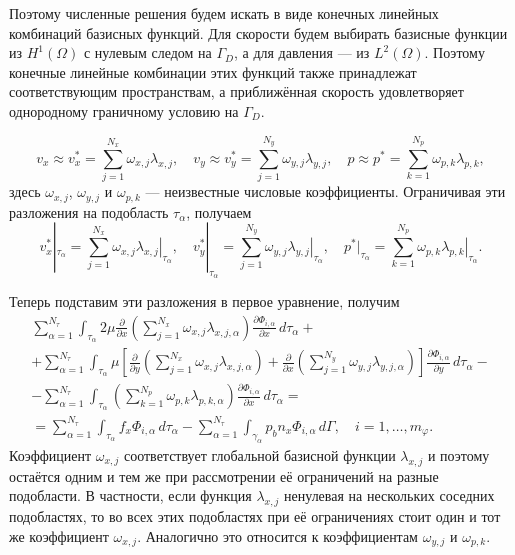 \documentclass[a4paper,14pt]{extarticle}
\begin{document}
Поэтому численные решения будем искать в виде конечных линейных комбинаций базисных функций.
Для скорости будем выбирать базисные функции из
$H^1(\Omega)$ с нулевым следом на $\Gamma_D$, а для давления
--- из $L^2(\Omega)$. Поэтому конечные линейные комбинации
этих функций также принадлежат соответствующим пространствам,
а приближённая скорость удовлетворяет однородному граничному
условию на $\Gamma_D$.

\begin{equation}
	v_x \approx
	v_x^*
	=
	\sum_{j=1}^{N_x}\omega_{x,j}\lambda_{x,j},
	\quad
	v_y\approx
	v_y^*
	=
	\sum_{j=1}^{N_y}\omega_{y,j}\lambda_{y,j},
	\quad
	p \approx
	p^*
	=
	\sum_{k=1}^{N_p}\omega_{p,k}\lambda_{p,k},
\end{equation}
здесь $\omega_{x,j}$, $\omega_{y,j}$ и $\omega_{p,k}$ ---
неизвестные числовые коэффициенты.
Ограничивая эти разложения на подобласть $\tau_\alpha$,
получаем
\begin{equation}
		v_x^*|_{\tau_\alpha}
		=
		\sum_{j=1}^{N_x}
		\omega_{x,j}
		\left.\lambda_{x,j}\right|_{\tau_\alpha},
		\quad
		v_y^*|_{\tau_\alpha}
		=
		\sum_{j=1}^{N_y}
		\omega_{y,j}
		\left.\lambda_{y,j}\right|_{\tau_\alpha},\quad
		p^*|_{\tau_\alpha}
		=
		\sum_{k=1}^{N_p}
		\omega_{p,k}
		\left.\lambda_{p,k}\right|_{\tau_\alpha}.
	\label{eq:local_approximation}
\end{equation}

Теперь подставим эти разложения в первое уравнение, получим
\begin{equation}
	\begin{gathered}
		\sum_{\alpha=1}^{N_\tau}
		\int_{\tau_\alpha}
		2\mu
		\frac{\partial}{\partial x}
		\left(
			\sum_{j=1}^{N_x}
			\omega_{x,j}\lambda_{x,j,\alpha}
		\right)
		\frac{\partial\Phi_{i,\alpha}}{\partial x}
		\,d\tau_\alpha
		+\\[6pt]
		+
		\sum_{\alpha=1}^{N_\tau}
		\int_{\tau_\alpha}
		\mu
		\left[
			\frac{\partial}{\partial y}
			\left(
				\sum_{j=1}^{N_x}
				\omega_{x,j}\lambda_{x,j,\alpha}
			\right)
			+
			\frac{\partial}{\partial x}
			\left(
				\sum_{j=1}^{N_y}
				\omega_{y,j}\lambda_{y,j,\alpha}
			\right)
		\right]
		\frac{\partial\Phi_{i,\alpha}}{\partial y}
		\,d\tau_\alpha
		-\\[6pt]
		-
		\sum_{\alpha=1}^{N_\tau}
		\int_{\tau_\alpha}
		\left(
			\sum_{k=1}^{N_p}
			\omega_{p,k}\lambda_{p,k,\alpha}
		\right)
		\frac{\partial\Phi_{i,\alpha}}{\partial x}
		\,d\tau_\alpha
		=\\[6pt]
		=
		\sum_{\alpha=1}^{N_\tau}
		\int_{\tau_\alpha}
		f_x\Phi_{i,\alpha}\,d\tau_\alpha
		-
		\sum_{\alpha=1}^{N_\tau}
		\int_{\gamma_\alpha}
		p_b n_x\Phi_{i,\alpha}\,d\Gamma,
		\quad
		i=1,\ldots,m_\varphi.
	\end{gathered}
\end{equation}
Коэффициент $\omega_{x,j}$ соответствует глобальной базисной
функции $\lambda_{x,j}$ и поэтому остаётся одним и тем же
при рассмотрении её ограничений на разные подобласти.
В частности, если функция $\lambda_{x,j}$ ненулевая на
нескольких соседних подобластях, то во всех этих подобластях
при её ограничениях стоит один и тот же коэффициент
$\omega_{x,j}$. Аналогично это относится к коэффициентам
$\omega_{y,j}$ и $\omega_{p,k}$.
\end{document}
